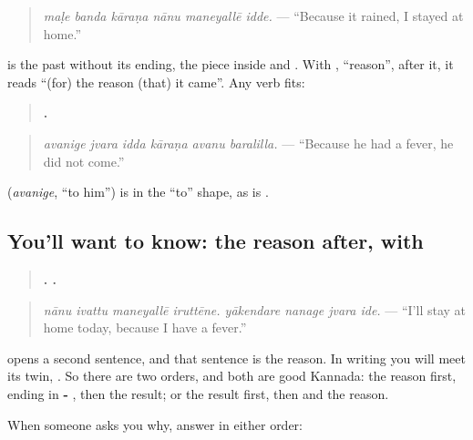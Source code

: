 \begin{quote}
\emph{maḷe banda kāraṇa nānu maneyallē idde.} — \textquotedblleft{}Because it rained, I stayed at home.\textquotedblright{}
\end{quote}

\textbf{} is the past without its ending, the piece inside \textbf{} and \textbf{ }. With \textbf{}, \textquotedblleft{}reason\textquotedblright{}, after it, it reads \textquotedblleft{}(for) the reason (that) it came\textquotedblright{}. Any verb fits:

\begin{quote}
\textbf{     .}
\end{quote}

\begin{quote}
\emph{avanige jvara idda kāraṇa avanu baralilla.} — \textquotedblleft{}Because he had a fever, he did not come.\textquotedblright{}
\end{quote}

\textbf{} (\emph{avanige}, \textquotedblleft{}to him\textquotedblright{}) is \textbf{} in the \textquotedblleft{}to\textquotedblright{} shape, as \textbf{} is \textbf{}.

\subsection*{You'll want to know: the reason after, with }
\begin{quote}
\textbf{   .    .}
\end{quote}

\begin{quote}
\emph{nānu ivattu maneyallē iruttēne. yākendare nanage jvara ide.} — \textquotedblleft{}I'll stay at home today, because I have a fever.\textquotedblright{}
\end{quote}

\textbf{} opens a second sentence, and that sentence is the reason. In writing you will meet its twin, \textbf{}. So there are two orders, and both are good Kannada: the reason first, ending in \textbf{- }, then the result; or the result first, then \textbf{} and the reason.

When someone asks you why, answer in either order:

